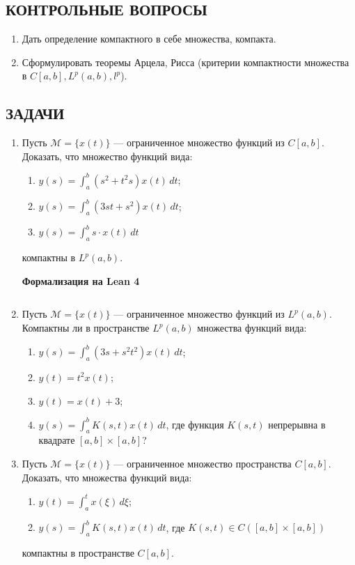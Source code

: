 \documentclass[12pt,a4paper]{article}
\begin{document}
\subsection*{КОНТРОЛЬНЫЕ ВОПРОСЫ}
\begin{enumerate}
\item Дать определение компактного в себе множества, компакта.
\item Сформулировать теоремы Арцела, Рисса (критерии компактности множества в $C[a,b], L^{p}(a,b), l^{p}$).
\end{enumerate}

\subsection*{ЗАДАЧИ}
\begin{enumerate}
\newpage
\item Пусть $\mathcal{M} = \{x(t)\}$ — ограниченное множество функций из $C[a,b]$. Доказать, что множество функций вида:
\begin{enumerate}[label=\alph*)]
\item $y(s) = \int_{a}^{b} (s^{2} + t^{2}s)x(t) \, dt$;
\item $y(s) = \int_{a}^{b} (3st + s^{2})x(t) \, dt$;
\item $y(s) = \int_{a}^{b} s \cdot x(t) \, dt$
\end{enumerate}
компактны в $L^{p}(a,b)$.


\begin{center}\small\textbf{Формализация на Lean 4}\end{center}
\inputminted{lean}{FunAn/Section20_CompactSets/Task01.lean}

\newpage

\item Пусть $\mathcal{M} = \{x(t)\}$ — ограниченное множество функций из $L^{p}(a,b)$. Компактны ли в пространстве $L^{p}(a,b)$ множества функций вида:
\begin{enumerate}[label=\alph*)]
\item $y(s) = \int_{a}^{b} (3s + s^{2}t^{2})x(t) \, dt$;
\item $y(t) = t^{2}x(t)$;
\item $y(t) = x(t) + 3$;
\item $y(s) = \int_{a}^{b} K(s,t)x(t) \, dt$, где функция $K(s,t)$ непрерывна в квадрате $[a,b] \times [a,b]$?
\end{enumerate}

\newpage
\item Пусть $\mathcal{M} = \{x(t)\}$ — ограниченное множество пространства $C[a,b]$. Доказать, что множества функций вида:
\begin{enumerate}[label=\alph*)]
\item $y(t) = \int_{a}^{t} x(\xi) \, d\xi$;
\item $y(s) = \int_{a}^{b} K(s,t)x(t) \, dt$, где $K(s,t) \in C([a,b] \times [a,b])$
\end{enumerate}
компактны в пространстве $C[a,b]$.



\end{enumerate}
\end{document}
